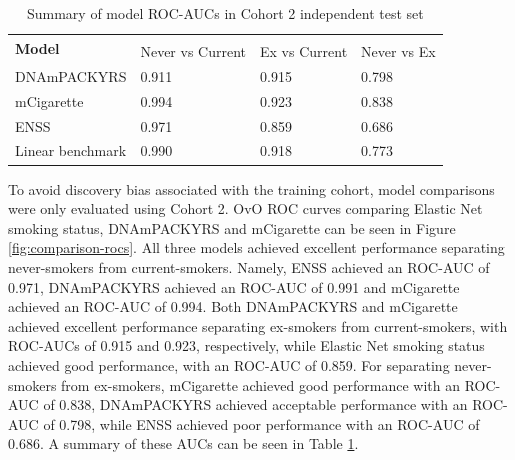 \documentclass{article} %
\begin{document}
\begin{table}[p]
    \caption{Summary of model ROC-AUCs in Cohort 2 independent test set} \label{table:auc-comparison}
    \begin{tabularx}{\textwidth}{X >{\centering\arraybackslash}X >{\centering\arraybackslash}X >{\centering\arraybackslash}X}
        \toprule
        \multirow{2}{*}{\textbf{Model}} & \multicolumn{3}{c}{\textbf{AUC}}                               \\
        \cmidrule(lr){2-4}
                                        & Never vs Current                 & Ex vs Current & Never vs Ex \\
        \midrule
        DNAmPACKYRS                     & \num{0.911}                      & \num{0.915}   & \num{0.798} \\
        \addlinespace
        mCigarette                      & \num{0.994}                      & \num{0.923}   & \num{0.838} \\
        \addlinespace
        ENSS                            & \num{0.971}                      & \num{0.859}   & \num{0.686} \\
        \addlinespace
        Linear benchmark                & \num{0.990}                      & \num{0.918}   & \num{0.773} \\
        \bottomrule
    \end{tabularx}
\end{table}

To avoid discovery bias associated with the training cohort, model comparisons were only evaluated using Cohort 2. OvO ROC curves comparing Elastic Net smoking status, DNAmPACKYRS and mCigarette can be seen in Figure \ref{fig:comparison-rocs}. All three models achieved excellent performance separating never-smokers from current-smokers. Namely, ENSS achieved an ROC-AUC of 0.971, DNAmPACKYRS achieved an ROC-AUC of 0.991 and mCigarette achieved an ROC-AUC of 0.994. Both DNAmPACKYRS and mCigarette achieved excellent performance separating ex-smokers from current-smokers, with ROC-AUCs of 0.915 and 0.923, respectively, while Elastic Net smoking status achieved good performance, with an ROC-AUC of 0.859. For separating never-smokers from ex-smokers, mCigarette achieved good performance with an ROC-AUC of 0.838, DNAmPACKYRS achieved acceptable performance with an ROC-AUC of 0.798, while ENSS achieved poor performance with an ROC-AUC of 0.686. A summary of these AUCs can be seen in Table \ref{table:auc-comparison}.
\end{document}
